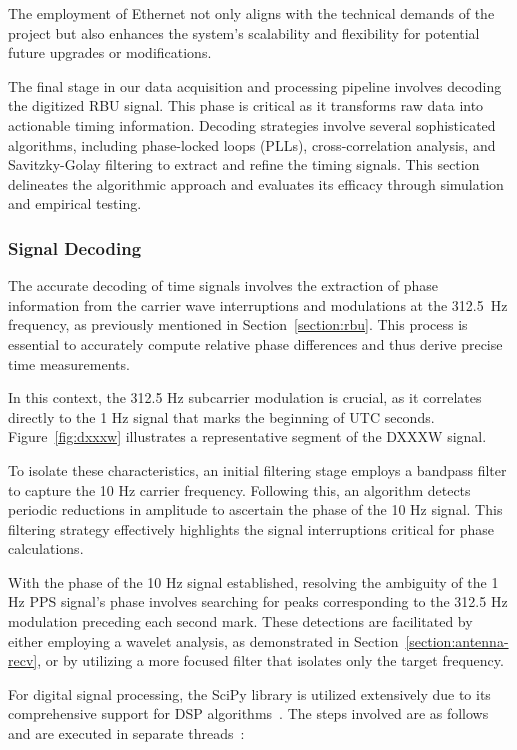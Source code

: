 \documentclass[12pt, a4paper]{extarticle}
\begin{document}
The employment of Ethernet not only aligns with the technical demands of the
project but also enhances the system's scalability and flexibility for
potential future upgrades or modifications.

The final stage in our data acquisition and processing pipeline involves
decoding the digitized RBU signal. This phase is critical as it transforms raw
data into actionable timing information. Decoding strategies involve several
sophisticated algorithms, including phase-locked loops (PLLs),
cross-correlation analysis, and Savitzky-Golay filtering to extract and refine
the timing signals. This section delineates the algorithmic approach and
evaluates its efficacy through simulation and empirical testing.

\subsubsection{Signal Decoding}

The accurate decoding of time signals involves the extraction of phase
information from the carrier wave interruptions and modulations at the 312.5~Hz
frequency, as previously mentioned in Section~\ref{section:rbu}. This process
is essential to accurately compute relative phase differences and thus derive
precise time measurements.

In this context, the 312.5 Hz subcarrier modulation is crucial, as it
correlates directly to the 1 Hz signal that marks the beginning of UTC seconds.
Figure~\ref{fig:dxxxw} illustrates a representative segment of the DXXXW
signal.

To isolate these characteristics, an initial filtering stage employs a bandpass
filter to capture the 10 Hz carrier frequency. Following this, an algorithm
detects periodic reductions in amplitude to ascertain the phase of the 10 Hz
signal. This filtering strategy effectively highlights the signal interruptions
critical for phase calculations.

With the phase of the 10 Hz signal established, resolving the ambiguity of the
1 Hz PPS signal's phase involves searching for peaks corresponding to the 312.5
Hz modulation preceding each second mark. These detections are facilitated by
either employing a wavelet analysis, as demonstrated in
Section~\ref{section:antenna-recv}, or by utilizing a more focused filter that
isolates only the target frequency.

For digital signal processing, the SciPy library is utilized extensively due to
its comprehensive support for DSP algorithms~\cite{scipy}. The steps involved
are as follows and are executed in separate threads~\cite{parallel}:
\end{document}
